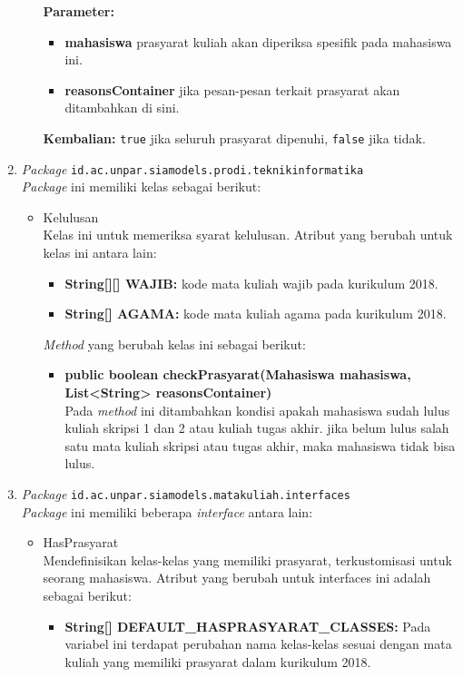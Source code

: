 \begin{enumerate}
\begin{itemize}
			\textbf{Parameter:}
			\begin{itemize}
				\item \textbf{mahasiswa} prasyarat kuliah akan diperiksa spesifik pada mahasiswa ini.
				\item \textbf{reasonsContainer} jika pesan-pesan terkait prasyarat akan ditambahkan di sini.
			\end{itemize}
			\textbf{Kembalian:} \texttt{true} jika seluruh prasyarat dipenuhi, \texttt{false} jika tidak.
	\end{itemize}
	\item \textit{Package} \texttt{id.ac.unpar.siamodels.prodi.teknikinformatika}\\
	\textit{Package} ini memiliki kelas sebagai berikut:
	\begin{itemize}
		\item Kelulusan\\
		Kelas ini untuk memeriksa syarat kelulusan. Atribut yang berubah untuk kelas ini antara lain:
		\begin{itemize}
			\item \textbf{String[][] WAJIB:} kode mata kuliah wajib pada kurikulum 2018.
			\item \textbf{String[] AGAMA:} kode mata kuliah agama pada kurikulum 2018.
		\end{itemize}
		\textit{Method} yang berubah kelas ini sebagai berikut:
		\begin{itemize}
			\item \textbf{public boolean checkPrasyarat(Mahasiswa mahasiswa, List<String> reasonsContainer)}\\
			Pada \textit{method} ini ditambahkan kondisi apakah mahasiswa sudah lulus kuliah skripsi 1 dan 2 atau kuliah tugas akhir. jika belum lulus salah satu mata kuliah skripsi atau tugas akhir, maka mahasiswa tidak bisa lulus.
		\end{itemize}
	\end{itemize}
	
	\item \textit{Package} \texttt{id.ac.unpar.siamodels.matakuliah.interfaces}\\
	\textit{Package} ini memiliki beberapa \textit{interface} antara lain:
	\begin{itemize}
		\item HasPrasyarat\\
		Mendefinisikan kelas-kelas yang memiliki prasyarat, terkustomisasi untuk seorang mahasiswa. Atribut yang berubah untuk interfaces ini adalah sebagai berikut:
		\begin{itemize}
			\item \textbf{String[] DEFAULT\_HASPRASYARAT\_CLASSES:} Pada variabel ini terdapat perubahan nama kelas-kelas sesuai dengan mata kuliah yang memiliki prasyarat dalam kurikulum 2018.
		\end{itemize}
	\end{itemize}
	

\end{enumerate}
